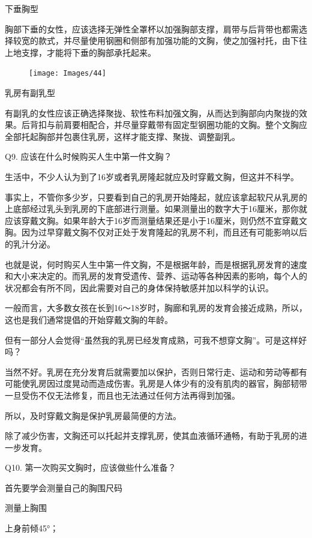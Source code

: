 \documentclass[12pt,UTF8]{ctexbook}
\begin{document}
下垂胸型

胸部下垂的女性，应该选择无弹性全罩杯以加强胸部支撑，肩带与后背带也都需选择较宽的款式，并尽量使用钢圈和侧部有加强功能的文胸，使之加强衬托，由下往上地支撑，才能将下垂的胸部承托起来。

\begin{figure}[htbp]
	\centering
	\texttt{[image: Images/44]}
	\caption{}
	\label{fig:1}
\end{figure}

乳房有副乳型

有副乳的女性应该正确选择聚拢、软性布料加强文胸，从而达到胸部向内聚拢的效果。后背扣与前肩要相配合，并尽量穿戴带有固定型钢圈功能的文胸。整个文胸应全部托起胸部并包裹住乳房，这样才能支撑、聚拢、调整副乳。

Q9. 应该在什么时候购买人生中第一件文胸？


生活中，不少人认为到了16岁或者乳房隆起就应及时穿戴文胸，但这并不科学。


事实上，不管你多少岁，只要看到自己的乳房开始隆起，就应该拿起软尺从乳房的上底部经过乳头到乳房的下底部进行测量。如果测量出的数字大于16厘米，那你就应该穿戴文胸。如果年龄大于16岁而测量结果还是小于16厘米，则仍然不宜穿戴文胸。因为过早穿戴文胸不仅对正处于发育隆起的乳房不利，而且还有可能影响以后的乳汁分泌。

也就是说，何时购买人生中第一件文胸，不是根据年龄，而是根据乳房发育的速度和大小来决定的。而乳房的发育受遗传、营养、运动等各种因素的影响，每个人的状况都会有所不同，因此需要对自己的身体保持敏感并加以科学的认识。


一般而言，大多数女孩在长到16～18岁时，胸廊和乳房的发育会接近成熟，所以，这也是我们通常提倡的开始穿戴文胸的年龄。

但有一部分人会觉得“虽然我的乳房已经发育成熟，可我不想穿文胸”。可是这样好吗？

当然不好。乳房在充分发育后就需要加以保护，否则日常行走、运动和劳动等都有可能使乳房因过度晃动而造成伤害。乳房是人体少有的没有肌肉的器官，胸部韧带一旦受伤不仅无法修复，而且也无法通过任何方法再得到加强。

所以，及时穿戴文胸是保护乳房最简便的方法。

除了减少伤害，文胸还可以托起并支撑乳房，使其血液循环通畅，有助于乳房的进一步发育。





Q10. 第一次购买文胸时，应该做些什么准备？


首先要学会测量自己的胸围尺码


测量上胸围

上身前倾45°；
\end{document}
